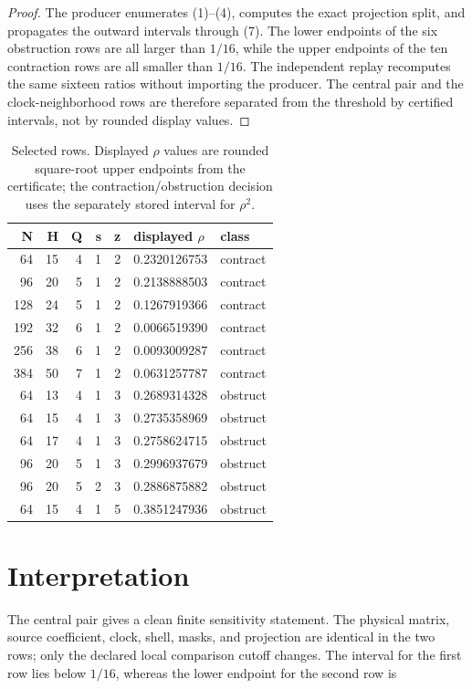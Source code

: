 \documentclass[11pt]{article}
\begin{document}
\begin{proof}
The producer enumerates (1)--(4), computes the exact projection split, and
propagates the outward intervals through (7). The lower endpoints of the
six obstruction rows are all larger than \(1/16\), while the upper endpoints
of the ten contraction rows are all smaller than \(1/16\). The independent
replay recomputes the same sixteen ratios without importing the producer.
The central pair and the clock-neighborhood rows are therefore separated
from the threshold by certified intervals, not by rounded display values.
\end{proof}

\begin{table}[t]
\centering
\caption{Selected rows. Displayed \(\rho\) values are rounded square-root
upper endpoints from the certificate; the contraction/obstruction decision
uses the separately stored interval for \(\rho^2\).}
\small
\begin{tabular}{rrrrrll}
\toprule
N&H&Q&s&z&displayed \(\rho\)&class\\
\midrule
64&15&4&1&2&0.2320126753&contract\\
96&20&5&1&2&0.2138888503&contract\\
128&24&5&1&2&0.1267919366&contract\\
192&32&6&1&2&0.0066519390&contract\\
256&38&6&1&2&0.0093009287&contract\\
384&50&7&1&2&0.0631257787&contract\\
64&13&4&1&3&0.2689314328&obstruct\\
64&15&4&1&3&0.2735358969&obstruct\\
64&17&4&1&3&0.2758624715&obstruct\\
96&20&5&1&3&0.2996937679&obstruct\\
96&20&5&2&3&0.2886875882&obstruct\\
64&15&4&1&5&0.3851247936&obstruct\\
\bottomrule
\end{tabular}
\end{table}

\section{Interpretation}

The central pair gives a clean finite sensitivity statement. The physical
matrix, source coefficient, clock, shell, masks, and projection are
identical in the two rows; only the declared local comparison cutoff changes.
The interval for the first row lies below \(1/16\), whereas the lower
endpoint for the second row is
\end{document}
